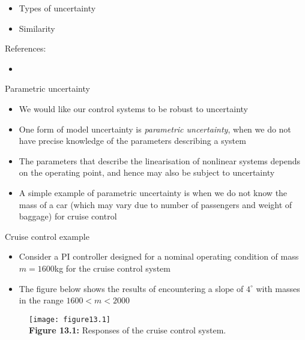\documentclass{beamer-control}
\begin{document}

\begin{SUMMARY}
\begin{itemize}
\item Types of uncertainty
\item Similarity
\end{itemize}
\vfill References:
\begin{itemize}
\item {}
\end{itemize}
\end{SUMMARY}




\begin{frame}{Parametric uncertainty}
\begin{itemize}
\item We would like our control systems to be robust to uncertainty 
\item One form of model uncertainty is \textit{parametric uncertainty}, when we do not have precise knowledge of the parameters describing a system
\item The parameters that describe the linearisation of nonlinear systems depends on the operating point, and hence may also be subject to uncertainty
\item A simple example of parametric uncertainty is when we do not know the mass of a car (which may vary due to number of passengers and weight of baggage) for cruise control
\end{itemize}
\end{frame}

\begin{frame}{Cruise control example}
\begin{itemize}
	\item Consider a PI controller designed for a nominal operating condition of mass $m=1600$kg for the cruise control system
	\item The figure below shows the results of encountering a slope of $4^\circ$ with masses in the range $1600<m<2000$ 
\end{itemize}
\begin{figure}
	\centering
	\texttt{[image: figure13.1]}\\
	\vspace{-0.2cm}
	\textbf{Figure 13.1:} Responses of the cruise control system.
\end{figure}
\end{frame}
\end{document}
